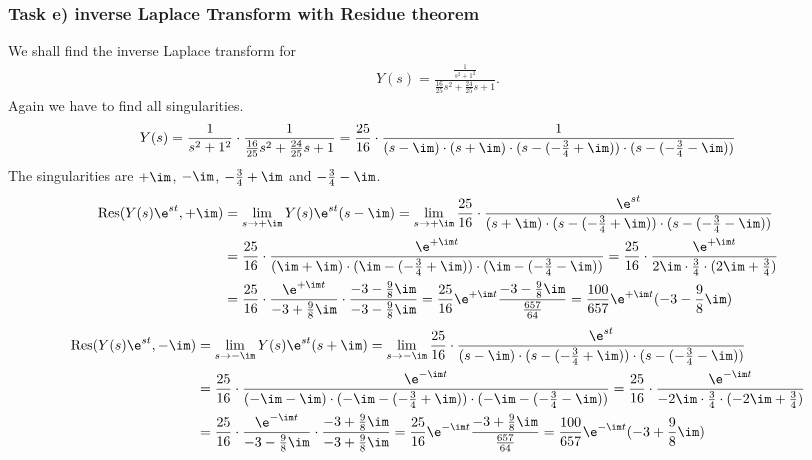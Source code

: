 \subsubsection{Task e) inverse Laplace Transform with Residue theorem}
We shall find the inverse Laplace transform for
\begin{align}
	Y(s) = \frac{\frac{1}{s^2 + 1^2}}{\frac{16}{25} s^2 + \frac{24}{25} s + 1}.
\end{align}
Again we have to find all singularities.
\begin{align}
	Y(s) = \frac{1}{s^2+1^2}\cdot\frac{1}{\frac{16}{25}s^2+\frac{24}{25}s+1}=\frac{25}{16}\cdot\frac{1}{(s-\im)\cdot(s+\im)\cdot(s-(-\frac{3}{4}+\im))\cdot(s-(-\frac{3}{4}-\im))}
\end{align}
The singularities are $+\im$, $-\im$, $-\frac{3}{4}+\im$ and $-\frac{3}{4}-\im$.
\begin{align}
	\mathrm{Res}(Y(s)\e^{st},+\im)&=\lim\limits_{s\rightarrow+\im}Y(s)\e^{st}(s-\im)=\lim\limits_{s\rightarrow +\im} \frac{25}{16}\cdot\frac{\e^{st}}{(s+\im)\cdot(s-(-\frac{3}{4}+\im))\cdot(s-(-\frac{3}{4}-\im))} \nonumber \\
	&= \frac{25}{16}\cdot\frac{\e^{+\im t}}{(\im+\im)\cdot(\im-(-\frac{3}{4}+\im))\cdot(\im-(-\frac{3}{4}-\im))}= \frac{25}{16}\cdot \frac{\e^{+\im t}}{2\im\cdot\frac{3}{4}\cdot(2\im+\frac{3}{4})} \nonumber \\
	&=\frac{25}{16}\cdot\frac{\e^{+\im t}}{-3+\frac{9}{8}\im}\cdot\frac{-3-\frac{9}{8}\im}{-3-\frac{9}{8}\im}=\frac{25}{16}\e^{+\im t}\frac{-3-\frac{9}{8}\im}{\frac{657}{64}}=\frac{100}{657}\e^{+\im t}(-3-\frac{9}{8}\im)
\end{align}
\begin{align}
	\mathrm{Res}(Y(s)\e^{st},-\im)&=\lim\limits_{s\rightarrow-\im}Y(s)\e^{st}(s+\im)=\lim\limits_{s\rightarrow -\im} \frac{25}{16}\cdot\frac{\e^{st}}{(s-\im)\cdot(s-(-\frac{3}{4}+\im))\cdot(s-(-\frac{3}{4}-\im))} \nonumber \\
	&= \frac{25}{16}\cdot\frac{\e^{-\im t}}{(-\im-\im)\cdot(-\im-(-\frac{3}{4}+\im))\cdot(-\im-(-\frac{3}{4}-\im))}= \frac{25}{16}\cdot \frac{\e^{-\im t}}{-2\im\cdot\frac{3}{4}\cdot(-2\im+\frac{3}{4})} \nonumber \\
	&=\frac{25}{16}\cdot\frac{\e^{-\im t}}{-3-\frac{9}{8}\im}\cdot\frac{-3+\frac{9}{8}\im}{-3+\frac{9}{8}\im}=\frac{25}{16}\e^{-\im t}\frac{-3+\frac{9}{8}\im}{\frac{657}{64}}=\frac{100}{657}\e^{-\im t}(-3+\frac{9}{8}\im)
\end{align}
